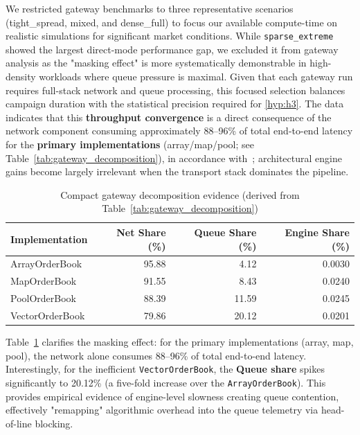 We restricted gateway benchmarks to three representative scenarios 
(tight\_spread, mixed, and dense\_full) to focus our available compute-time on 
realistic simulations for significant market conditions. While 
\texttt{sparse\_extreme} showed the largest direct-mode performance gap, 
we excluded it from gateway analysis as the "masking effect" is more 
systematically demonstrable in high-density workloads where queue 
pressure is maximal. Given that 
each gateway run requires full-stack network and queue processing, this focused 
selection balances campaign duration with the statistical precision required for \ref{hyp:h3}.
The data indicates that this 
\textbf{throughput convergence} is a direct consequence of the network 
component consuming approximately 88--96\% of total end-to-end latency for 
the \textbf{primary implementations} (array/map/pool; see 
Table~\ref{tab:gateway_decomposition}), in accordance with~; 
architectural engine gains become largely irrelevant when the transport 
stack dominates the pipeline.

\begin{table}[htbp]
    \centering
    \small
    \begin{tabular}{lrrr}
        \toprule
        \textbf{Implementation} & \textbf{Net Share (\%)} & \textbf{Queue Share (\%)} & \textbf{Engine Share (\%)} \\
        \midrule
        ArrayOrderBook   & 95.88 & 4.12  & 0.0030 \\
        MapOrderBook     & 91.55 & 8.43  & 0.0240 \\
        PoolOrderBook    & 88.39 & 11.59 & 0.0245 \\
        VectorOrderBook  & 79.86 & 20.12 & 0.0201 \\
        \bottomrule
    \end{tabular}
    \caption{Compact gateway decomposition evidence (derived from Table~\ref{tab:gateway_decomposition})}
    \label{tab:gateway_share_compact}
\end{table}

Table~\ref{tab:gateway_share_compact} clarifies the masking effect:
for the primary implementations (array, map, pool), the network alone consumes 
88--96\% of total end-to-end latency. Interestingly, for the inefficient 
\texttt{VectorOrderBook}, the \textbf{Queue share} spikes significantly to 
20.12\% (a five-fold increase over the \texttt{ArrayOrderBook}). This provides 
empirical evidence of engine-level slowness creating queue contention, 
effectively "remapping" algorithmic overhead into the queue telemetry via 
head-of-line blocking.

